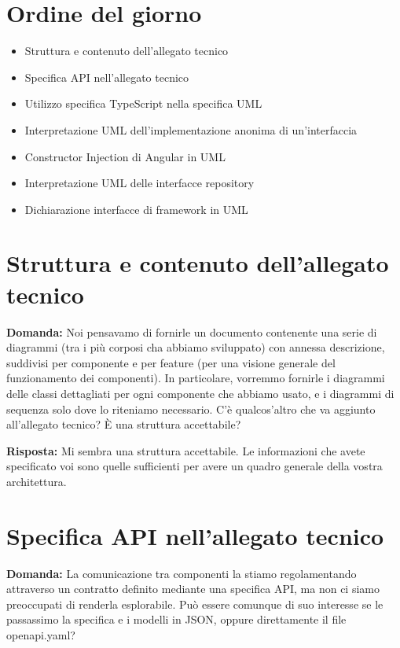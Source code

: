 \documentclass{article}
\begin{document}
\section{Ordine del giorno}%
\label{sec:ordine_del_giorno}

\begin{itemize}
  \item Struttura e contenuto dell'allegato tecnico
  \item Specifica API nell'allegato tecnico
  \item Utilizzo specifica TypeScript nella specifica UML
  \item Interpretazione UML dell'implementazione anonima di un'interfaccia
  \item Constructor Injection di Angular in UML
  \item Interpretazione UML delle interfacce repository
  \item Dichiarazione interfacce di framework in UML
\end{itemize}

\section{Struttura e contenuto dell'allegato tecnico}%
\label{sec:struttura_e_contenuto_allegato_tecnico}

\textbf{Domanda:} Noi pensavamo di fornirle un documento contenente una serie di diagrammi (tra i più corposi cha abbiamo sviluppato) con annessa descrizione, suddivisi per componente e per feature (per una visione generale del funzionamento dei componenti). In particolare, vorremmo fornirle i diagrammi delle classi dettagliati per ogni componente che abbiamo usato, e i diagrammi di sequenza solo dove lo riteniamo necessario. C'è qualcos'altro che va aggiunto all'allegato tecnico? È una struttura accettabile?

\textbf{Risposta:} Mi sembra una struttura accettabile. Le informazioni che avete specificato voi sono quelle sufficienti per avere un quadro generale della vostra architettura.

\section{Specifica API nell'allegato tecnico}%
\label{sec:specifica_api_allegato_tecnico}

\textbf{Domanda:} La comunicazione tra componenti la stiamo regolamentando attraverso un contratto definito mediante una specifica API, ma non ci siamo preoccupati di renderla esplorabile. Può essere comunque di suo interesse se le passassimo la specifica e i modelli in JSON, oppure direttamente il file openapi.yaml?
\end{document}
